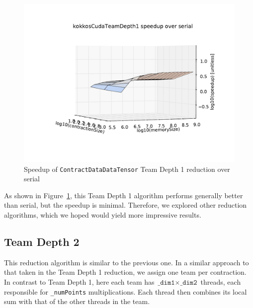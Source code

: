 \begin{figure}[ht]
    \begin{centering}
    \includegraphics[width=5in]{./VersusSerial_kokkosCudaTeamDepth1_clearCache_shadowfax}
\end{centering}
    \caption[Performance of \texttt{ContractDataDataTensor} Team Depth
    1]{Speedup of \texttt{ContractDataDataTensor} Team Depth 1 reduction over
    serial
\label{fig:ContractDataDataTensorDepth1}} 
\end{figure}

As shown in Figure~\ref{fig:ContractDataDataTensorDepth1}, this Team Depth 1
algorithm performs generally better than serial, but the speedup is minimal.
Therefore, we explored other reduction algorithms, which we hoped would yield
more impressive results.

\subsection{Team Depth 2}
    This reduction algorithm is similar to the previous one.  In a similar
    approach to that taken in the Team Depth 1 reduction, we assign one team per
    contraction.  In contrast to Team Depth 1, here each team has
    $\texttt{\_dim1} \times \texttt{\_dim2}$ threads, each responsible for
    \texttt{\_numPoints} multiplications.  Each thread then combines its local
    sum with that of the other threads in the team.

